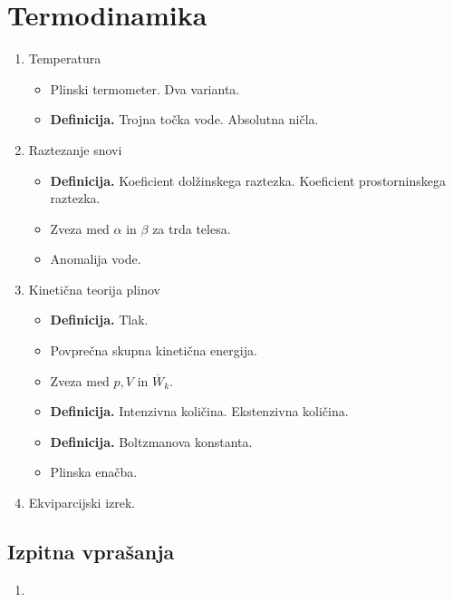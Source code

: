 \section{Termodinamika}
\begin{enumerate}
    \item Temperatura
    \begin{itemize}
        \item Plinski termometer. Dva varianta.
        \item \textbf{Definicija.} Trojna točka vode. Absolutna ničla.
    \end{itemize}

    \item Raztezanje snovi
    \begin{itemize}
        \item \textbf{Definicija.} Koeficient dolžinskega raztezka. Koeficient prostorninskega raztezka.
        \item Zveza med \(\alpha\) in \(\beta\) za trda telesa.
        \item Anomalija vode.
    \end{itemize}

    \item Kinetična teorija plinov
    \begin{itemize}
        \item \textbf{Definicija.} Tlak.
        \item Povprečna skupna kinetična energija.
        \item Zveza med \(p, V\) in \(\overline{W}_k\).
        \item \textbf{Definicija.} Intenzivna količina. Ekstenzivna količina.
        \item \textbf{Definicija.} Boltzmanova konstanta.
        \item Plinska enačba.
    \end{itemize}

    \item Ekviparcijski izrek.
\end{enumerate}

\newpage
\subsection*{Izpitna vprašanja}
\begin{enumerate}
    \item 
\end{enumerate}